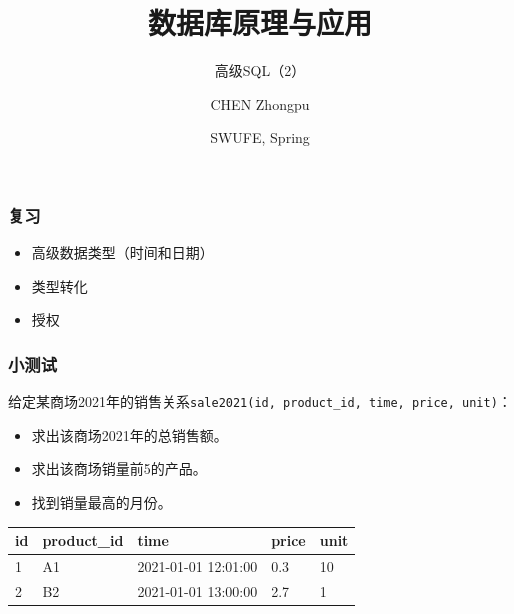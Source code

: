 \documentclass[aspectratio=169, 14pt]{beamer}
\title[Database Principles and Applications] %
{数据库原理与应用}
\subtitle{高级SQL（2）}
\author[CHEN Zhongpu] %
{CHEN Zhongpu}
\institute[] %
{
  School of Computing and Artificial Intelligence \\
  \href{mailto:zpchen@swufe.edu.cn}{zpchen@swufe.edu.cn}
}
\date[] %
{SWUFE, Spring \the\year{}}
\begin{document}
\frame{\titlepage}


\begin{frame}
	\frametitle{复习}
	\begin{itemize}
		\item 高级数据类型（时间和日期）
		\item 类型转化
		\item 授权
	\end{itemize}

\end{frame}
\begin{frame}
	\frametitle{小测试}
	给定某商场2021年的销售关系\texttt{sale2021(id, product\_id, time, price, unit)}：
	\begin{itemize}
		\item 求出该商场2021年的总销售额。
		\item 求出该商场销量前5的产品。
		\item 找到销量最高的月份。
	\end{itemize}
	\begin{table}
		\begin{tabular}{lllll}
			\toprule
			id & product\_id & time                & price & unit \\
			\midrule
			1  & A1          & 2021-01-01 12:01:00 & 0.3   & 10   \\
			2  & B2          & 2021-01-01 13:00:00 & 2.7   & 1    \\
			\bottomrule
		\end{tabular}
	\end{table}
\end{frame}
\end{document}
